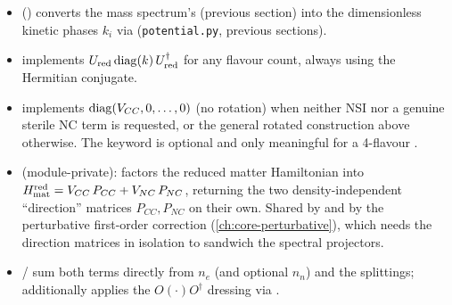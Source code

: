 \begin{implbox}
\begin{itemize}
  \item {}
    () converts the mass spectrum's
     (previous section) into the dimensionless
    kinetic phases $k_i$ via 
    (\texttt{potential.py}, previous sections).
  \item {} implements
    $U_{\rm red}\operatorname{diag}(k)\,U_{\rm red}^\dagger$ for any flavour count, always
    using the Hermitian conjugate.
  \item {} implements $\operatorname{diag}(V_{CC},0,\dots,0)$ (no
    rotation) when neither NSI nor a genuine sterile NC term is requested,
    or the general rotated construction above otherwise. The
     keyword is optional and only meaningful for a
    4-flavour .
  \item {} (module-private): factors the reduced matter
    Hamiltonian into $H_{\rm mat}^{\rm red}=V_{CC}\,P_{CC} + V_{NC}\,P_{NC}$,
    returning the two density-independent ``direction'' matrices
    $P_{CC},P_{NC}$ on their own. Shared by
     and by the perturbative
    first-order correction (\cref{ch:core-perturbative}), which needs the
    direction matrices in isolation to sandwich the spectral projectors.
  \item {} / 
    sum both terms directly from $n_e$ (and optional $n_n$) and the
    splittings;  additionally applies the
    $O(\cdot)O^\dagger$ dressing via .
\end{itemize}
\end{implbox}

